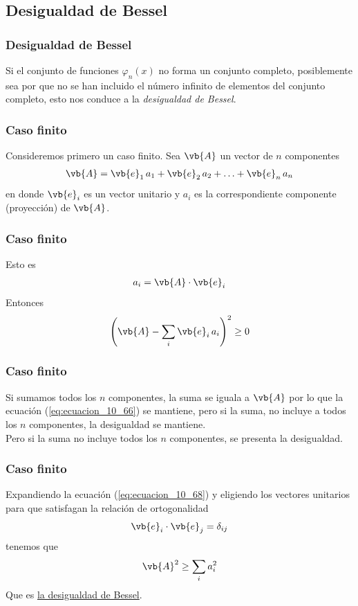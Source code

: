 \subsection{Desigualdad de Bessel}
\begin{frame}
\frametitle{Desigualdad de Bessel}
Si el conjunto de funciones $\varphi_{n} (x)$ no forma un conjunto completo, posiblemente sea por que no se han incluido el número infinito de elementos del conjunto completo, esto nos conduce a la \emph{desigualdad de Bessel}. 
\end{frame}
\begin{frame}
\frametitle{Caso finito}
Consideremos primero un caso finito. Sea $\vb{A}$ un vector de $n$ componentes
\begin{align}
\vb{A} = \vb{e}_{1} \, a_{1} + \vb{e}_{2} \, a_{2} + \ldots + \vb{e}_{n} \, a_{n} 
\label{eq:ecuacion_10_66}
\end{align}
en donde $\vb{e}_{i}$ es un vector unitario y $a_{i}$ es la correspondiente componente (proyección) de $\vb{A}$.
\end{frame}
\begin{frame}
\frametitle{Caso finito}
Esto es
\begin{align}
a_{i} = \vb{A} \cdot \vb{e}_{i}
\label{eq:ecuacion_10_67}
\end{align}
\pause
Entonces
\begin{align}
\left( \vb{A} - \sum_{i} \vb{e}_{i} \, a_{i} \right)^{2} \geq 0
\label{eq:ecuacion_10_68}
\end{align}
\end{frame}
\begin{frame}
\frametitle{Caso finito}
Si sumamos todos los $n$ componentes, la suma se iguala a $\vb{A}$ por lo que la ecuación (\ref{eq:ecuacion_10_66}) se mantiene, pero si la suma, no incluye a todos los $n$ componentes, la desigualdad se mantiene.
\\
\bigskip
\pause
Pero si la suma no incluye todos los $n$ componentes, se presenta la desigualdad.
\end{frame}
\begin{frame}
\frametitle{Caso finito}
Expandiendo la ecuación (\ref{eq:ecuacion_10_68}) y eligiendo los vectores unitarios para que satisfagan la relación de ortogonalidad
\begin{align}
\vb{e}_{i} \cdot \vb{e}_{j} =  \delta_{ij}
\label{eq:ecuacion_10_69}
\end{align}
\pause
tenemos que
\begin{align}
\vb{A}^{2} \geq \sum_{i} a_{i}^{2}
\label{eq:ecuacion_10_70}
\end{align}
Que es \underline{la desigualdad de Bessel}.
\end{frame}
